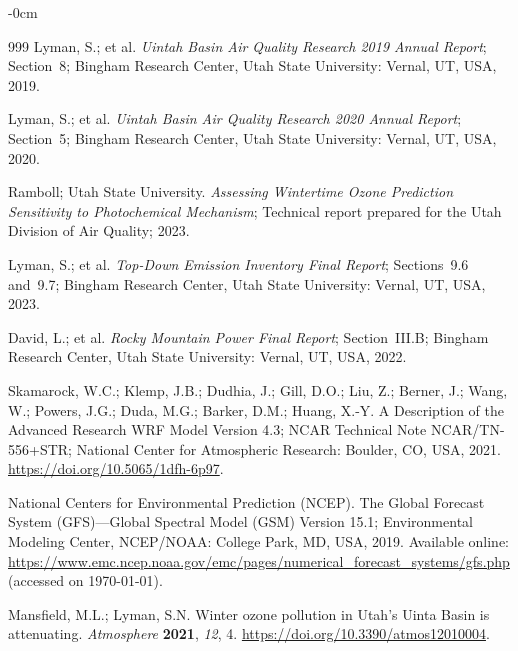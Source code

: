 \documentclass[air,article,submit,pdftex,moreauthors]{Definitions/mdpi}
\begin{document}
\begin{adjustwidth}{-\extralength}{0cm}
{\begin{thebibliography}{999}
Lyman, S.; et al. {\em Uintah Basin Air Quality Research 2019 Annual
Report}; Section~8; Bingham Research Center, Utah State University: Vernal,
UT, USA, 2019.

Lyman, S.; et al. {\em Uintah Basin Air Quality Research 2020 Annual
Report}; Section~5; Bingham Research Center, Utah State University: Vernal,
UT, USA, 2020.

Ramboll; Utah State University. {\em Assessing Wintertime Ozone Prediction
Sensitivity to Photochemical Mechanism}; Technical report prepared for the
Utah Division of Air Quality; 2023.

Lyman, S.; et al. {\em Top-Down Emission Inventory Final Report}; Sections~9.6
and~9.7; Bingham Research Center, Utah State University: Vernal, UT, USA, 2023.

David, L.; et al. {\em Rocky Mountain Power Final Report}; Section~III.B;
Bingham Research Center, Utah State University: Vernal, UT, USA, 2022.

Skamarock, W.C.; Klemp, J.B.; Dudhia, J.; Gill, D.O.; Liu, Z.; Berner, J.;
Wang, W.; Powers, J.G.; Duda, M.G.; Barker, D.M.; Huang, X.-Y.
A Description of the Advanced Research WRF Model Version 4.3;
NCAR Technical Note NCAR/TN-556+STR; National Center for Atmospheric
Research: Boulder, CO, USA, 2021.
\url{https://doi.org/10.5065/1dfh-6p97}.

National Centers for Environmental Prediction (NCEP).
The Global Forecast System (GFS)---Global Spectral Model (GSM)
Version 15.1; Environmental Modeling Center, NCEP/NOAA: College Park,
MD, USA, 2019. Available online:
\url{https://www.emc.ncep.noaa.gov/emc/pages/numerical_forecast_systems/gfs.php}
(accessed on \today).

Mansfield, M.L.; Lyman, S.N. Winter ozone pollution in Utah's Uinta Basin
is attenuating. {\em Atmosphere} {\bf 2021}, {\em 12}, 4.
\url{https://doi.org/10.3390/atmos12010004}.

\end{thebibliography}
}

\PublishersNote{}
\end{adjustwidth}
\end{document}
